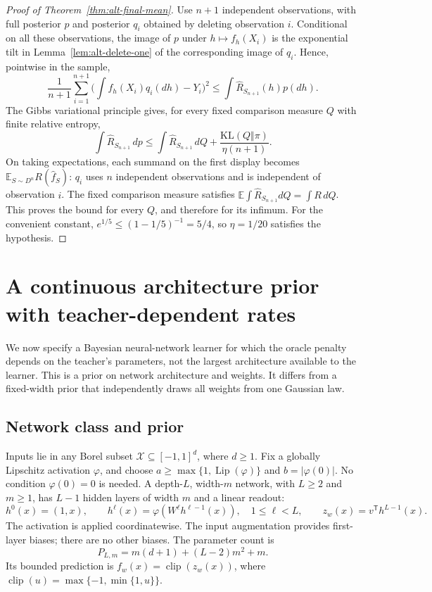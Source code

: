 \begin{proof}[Proof of Theorem~\ref{thm:alt-final-mean}]
Use $n+1$ independent observations, with full posterior $p$ and posterior
$q_i$ obtained by deleting observation $i$.  Conditional on all these
observations, the image of $p$ under $h\mapsto f_h(X_i)$ is the
exponential tilt in Lemma~\ref{lem:alt-delete-one} of the corresponding
image of $q_i$.  Hence, pointwise in the sample,
\[
 \frac1{n+1}\sum_{i=1}^{n+1}
     \biggl(\int f_h(X_i)q_i(dh)-Y_i\biggr)^2
 \le \int\widehat R_{S_{n+1}}(h)p(dh).
\]
The Gibbs variational principle gives, for every fixed comparison
measure $Q$ with finite relative entropy,
\[
 \int\widehat R_{S_{n+1}}\,dp
 \le \int\widehat R_{S_{n+1}}\,dQ
       +\frac{\mathrm{KL}(Q\Vert\pi)}{\eta(n+1)}.
\]
On taking expectations, each summand on the first display becomes
$\mathbb E_{S\sim D^n}R(\widehat f_S)$: $q_i$ uses $n$ independent
observations and is independent of observation $i$.  The fixed
comparison measure satisfies
$\mathbb E\int\widehat R_{S_{n+1}}dQ=\int R\,dQ$.
This proves the bound for every $Q$, and therefore for its infimum.
For the convenient constant, $e^{1/5}\le(1-1/5)^{-1}=5/4$, so
$\eta=1/20$ satisfies the hypothesis.
\end{proof}

\section{A continuous architecture prior with teacher-dependent rates}
\label{sec:alt-architecture}

We now specify a Bayesian neural-network learner for which the oracle
penalty depends on the teacher's parameters, not the largest architecture
available to the learner.  This is a prior on network architecture and
weights.  It differs from a fixed-width prior that independently draws
all weights from one Gaussian law.

\subsection{Network class and prior}

Inputs lie in any Borel subset $\mathcal X\subseteq[-1,1]^d$, where
$d\ge1$.  Fix a globally Lipschitz activation $\varphi$, and choose
$a\ge\max\{1,\operatorname{Lip}(\varphi)\}$ and
$b=|\varphi(0)|$.  No condition $\varphi(0)=0$ is needed.
A depth-$L$, width-$m$ network, with $L\ge2$ and $m\ge1$, has
$L-1$ hidden layers of width $m$ and a linear readout:
\[
 h^0(x)=(1,x),\qquad h^\ell(x)=\varphi(W^\ell h^{\ell-1}(x)),
 \quad 1\le\ell<L,\qquad z_w(x)=v^{\mathsf T}h^{L-1}(x).
\]
The activation is applied coordinatewise.  The input augmentation
provides first-layer biases; there are no other biases.  The parameter
count is
\begin{equation}
 P_{L,m}=m(d+1)+(L-2)m^2+m.
 \label{eq:alt-parameter-count}
\end{equation}
Its bounded prediction is $f_w(x)=\operatorname{clip}(z_w(x))$, where
$\operatorname{clip}(u)=\max\{-1,\min\{1,u\}\}$.

